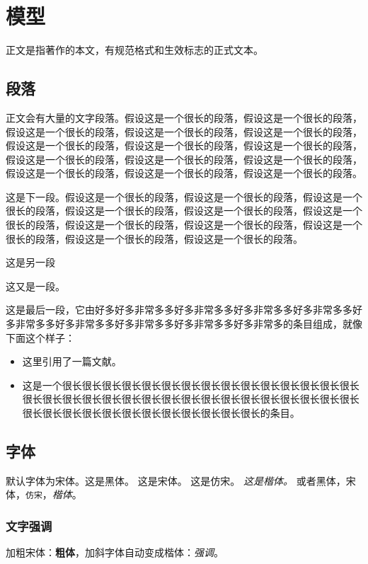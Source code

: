 \documentclass[12pt]{article} %
\begin{document}
\section{模型}
正文是指著作的本文，有规范格式和生效标志的正式文本。

\subsection{段落}
正文会有大量的文字段落。假设这是一个很长的段落，假设这是一个很长的段落，假设这是一个很长的段落，假设这是一个很长的段落，假设这是一个很长的段落，假设这是一个很长的段落，假设这是一个很长的段落，假设这是一个很长的段落，假设这是一个很长的段落，假设这是一个很长的段落，假设这是一个很长的段落，假设这是一个很长的段落，假设这是一个很长的段落，假设这是一个很长的段落。

这是下一段。假设这是一个很长的段落，假设这是一个很长的段落，假设这是一个很长的段落，假设这是一个很长的段落，假设这是一个很长的段落，假设这是一个很长的段落，假设这是一个很长的段落，假设这是一个很长的段落，假设这是一个很长的段落，假设这是一个很长的段落，假设这是一个很长的段落。

这是另一段

这又是一段。

这是最后一段，它由好多好多非常多多好多非常多多好多非常多多好多非常多多好多非常多多好多非常多多好多非常多多好多非常多多好多非常多的条目组成，就像下面这个样子：

\begin{itemize}
  \item 这里引用了一篇文献\cite{aokiPointNetLKRobustEfficient2019}。
  \item 这是一个很长很长很长很长很长很长很长很长很长很长很长很长很长很长很长很长很长很长很长很长很长很长很长很长很长很长很长很长很长很长很长很长很长很长很长很长很长很长很长很长很长很长很长很长的条目。
\end{itemize}

\subsection{字体}
默认字体为宋体。{\sffamily 这是黑体。} {\rmfamily 这是宋体。} {\ttfamily 这是仿宋。} {\it 这是楷体。}
或者\textsf{黑体}，\textrm{宋体}，\texttt{仿宋}，\textit{楷体}。

\subsubsection{文字强调}
加粗宋体：\textbf{粗体}，加斜字体自动变成楷体：\textit{强调}。
\end{document}

